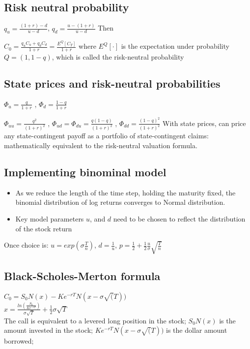 \subsection*{Risk neutral probability}

$q_u=\frac{(1+r)-d}{u-d}$, $q_d = \frac{u-(1+r)}{u-d}$ Then

$C_0=\frac{q_u C_u + q_d C_d}{1+r} = \frac{E^Q[C_T]}{1+r}$ 
where $E^Q[\cdot]$ is the expectation under probability $Q=(1,1-q)$, which is
called the risk-neutral probability

\subsection*{State prices and risk-neutral probabilities}
$\Phi_u = \frac{q}{1+r}$ , $\Phi_d = \frac{1-q}{1+r}$

$\Phi_{uu} = \frac{q^2}{(1+r)^2}$ , $\Phi_{ud} = \Phi_{du} = \frac{q(1-q)}{(1+r)^2}$ , $\Phi_{dd} = \frac{(1-q)^2}{(1+r)^2}$
With state prices, can price any state-contingent payoff as a portfolio of
state-contingent claims: mathematically equivalent to the risk-neutral
valuation formula.


\subsection*{Implementing binominal model}

\begin{itemize}
	\item As we reduce the length of the time step, holding the maturity fixed, the
	binomial distribution of log returns converges to Normal distribution.
	\item Key model parameters $u$, and $d$ need to be chosen to reflect the
	distribution of the stock return
\end{itemize}

Once choice is:  $u=exp(\sigma \frac{T}{n})$, $d=\frac{1}{u}$, $p=\frac{1}{2} + \frac{1}{2} \frac{u}{\sigma} \sqrt{\frac{T}{n}}$

\subsection*{Black-Scholes-Merton formula}

$C_0 = S_0 N(x) - K e^{-rT} N (x-\sigma \sqrt(T))$ \\
$x = \frac{ln(\frac{S_0}{K e^{-rT}})}{\sigma \sqrt{T}} + \frac{1}{2} \sigma \sqrt{T}$ \\

The call is equivalent to a levered long position in the stock;
 $S_0 N(x) $ is the amount invested in the stock;
$K e^{-rT} N (x-\sigma \sqrt(T))$ is the dollar amount borrowed;




